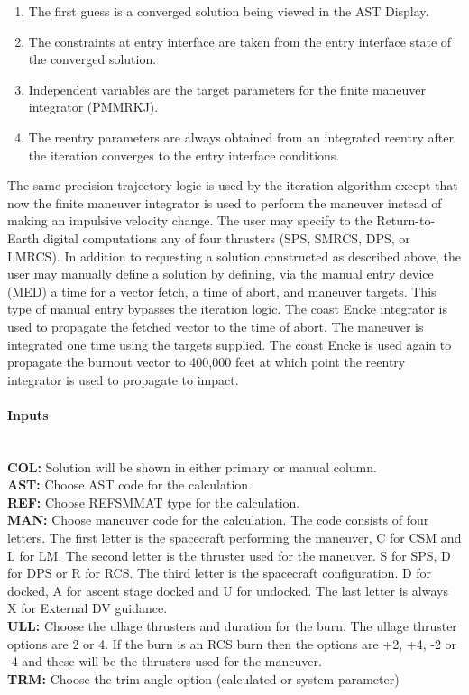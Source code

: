 \documentclass[11pt]{article} %
\begin{document}
\begin{enumerate}
	\item The first guess is a converged solution being viewed in the AST Display.
	\item The constraints at entry interface are taken from the entry interface state of the converged solution.
	\item Independent variables are the target parameters for the finite maneuver integrator (PMMRKJ).
	\item The reentry parameters are always obtained from an integrated reentry after the iteration converges to the entry interface conditions.
\end{enumerate}
The same precision trajectory logic is used by the iteration algorithm except that now the finite maneuver integrator is used to perform the maneuver instead of
making an impulsive velocity change. The user may specify to the Return-to-Earth digital computations any of four thrusters (SPS, SMRCS, DPS, or LMRCS).
In addition to requesting a solution constructed as described above, the user may manually define a solution by defining, via the manual entry device (MED) a time
for a vector fetch, a time of abort, and maneuver targets. This type of manual entry bypasses the iteration logic. The coast Encke integrator is used to propagate the fetched vector to the time of abort. The maneuver is integrated one time using the targets supplied. The coast Encke is used again to propagate the burnout vector to 400,000 feet at which point the reentry integrator is used to propagate to impact.

\paragraph{Inputs}\mbox{} \\
\textbf{COL:} Solution will be shown in either primary or manual column.\\
\textbf{AST:} Choose AST code for the calculation.\\
\textbf{REF:} Choose REFSMMAT type for the calculation.\\
\textbf{MAN:} Choose maneuver code for the calculation. The code consists of four letters. The first letter is the spacecraft performing the maneuver, C for CSM and L for LM. The second letter is the thruster used for the maneuver. S for SPS, D for DPS or R for RCS. The third letter is the spacecraft configuration. D for docked, A for ascent stage docked and U for undocked. The last letter is always X for External DV guidance.\\
\textbf{ULL:} Choose the ullage thrusters and duration for the burn. The ullage thruster options are 2 or 4. If the burn is an RCS burn then the options are +2, +4, -2 or -4 and these will be the thrusters used for the maneuver.\\
\textbf{TRM:} Choose the trim angle option (calculated or system parameter)\\
\end{document}

